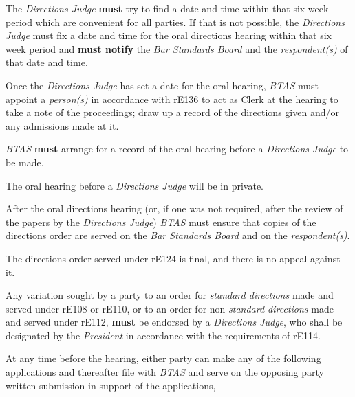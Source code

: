 The \emph{Directions Judge}  \textcolor{myred}{\textbf{must}} try to find a date and time within that
six week period which are convenient for all parties. If that is not
possible, the \emph{Directions Judge }must fix a date and time for the
oral directions hearing within that six week period and  \textcolor{myred}{\textbf{must notify}}
the \emph{Bar Standards Board} and the \emph{respondent(s)} of that date
and time.\\
\par
Once the \emph{Directions Judge }has set a date for the oral
hearing, \emph{BTAS }must appoint a \emph{person(s)} in accordance with
rE136 to act as Clerk at the hearing to take a note of the proceedings;
draw up a record of the directions given and/or any admissions made at
it.\\
\par
\emph{BTAS}  \textcolor{myred}{\textbf{must}} arrange for a record of the oral hearing before
a \emph{Directions Judge }to be made.\\
\par
The oral hearing before a \emph{Directions Judge} will be in private.\\
\par
After the oral directions hearing (or, if one was not required, after
the review of the papers by the \emph{Directions
Judge}) \emph{BTAS }must ensure that copies of the directions order are
served on the \emph{Bar Standards Board} and on
the \emph{respondent(s)}.\\
\par
The directions order served under rE124 is final, and there is no appeal
against it.\\
\par
Any variation sought by a party to an order for \emph{standard
directions} made and served under rE108 or rE110, or to an order for
non-\emph{standard directions} made and served under rE112,  \textcolor{myred}{\textbf{must}} be
endorsed by a \emph{Directions Judge}, who shall be designated by
the \emph{President} in accordance with the requirements of rE114.\\
\par
{}
At any time before the hearing, either party can make any of the
following applications and thereafter file with \emph{BTAS} and serve on
the opposing party written submission in support of the applications,
